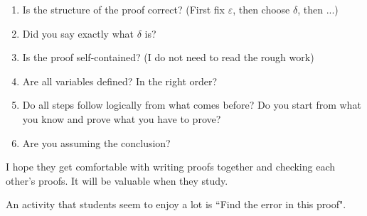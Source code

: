 \documentclass[11pt]{article}
\newcommand{\e}{\varepsilon}
\begin{document}
\begin{example}
\begin{comments}
\begin{center}
\begin{minipage}{0.8\textwidth}
	\begin{enumerate}
	\item  Is the structure of the proof correct?  
	(First fix $\e$, then choose $\delta$, then ...)
	\item  Did you say exactly what $\delta$ is?
	\item  Is the proof self-contained?  
	 (I do not need to read the rough work)
	\item  Are all variables defined?  In the right order? 
	\item  Do all steps follow logically from what comes before? 
	Do you start from what you know and prove what you have to prove? 
	\item  Are you assuming the conclusion?
\end{enumerate}
	
\end{minipage}
\end{center}I hope they get comfortable with writing proofs together and checking each other's proofs.  It will be valuable when they study.
\end{comments}
\end{example}


\newpage

An activity that students seem to enjoy a lot is ``Find the error in this proof".
\end{document}
